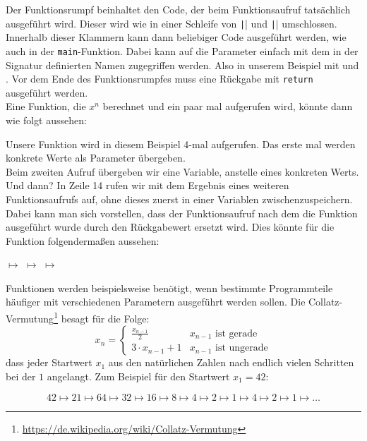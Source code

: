 Der Funktionsrumpf beinhaltet den Code, der beim Funktionsaufruf tatsächlich ausgeführt wird.
Dieser wird wie in einer Schleife von \texttt|{| und \texttt|}| umschlossen.
Innerhalb dieser Klammern kann dann beliebiger Code ausgeführt werden, wie auch in der \texttt{main}-Funktion.
Dabei kann auf die Parameter einfach mit dem in der Signatur definierten Namen zugegriffen werden.
Also in unserem Beispiel mit  und .
Vor dem Ende des Funktionsrumpfes muss eine Rückgabe mit \texttt{return} ausgeführt werden.\\
\newpage
Eine Funktion, die $ x^n $ berechnet und ein paar mal aufgerufen wird, könnte dann wie folgt aussehen:


Unsere Funktion wird in diesem Beispiel 4-mal aufgerufen.
Das erste mal werden konkrete Werte als Parameter übergeben.\\
Beim zweiten Aufruf übergeben wir eine Variable, anstelle eines konkreten Werts.\\
Und dann? In Zeile 14 rufen wir  mit dem Ergebnis eines weiteren Funktionsaufrufs auf, ohne dieses zuerst in einer Variablen zwischenzuspeichern.
Dabei kann man sich vorstellen, dass der Funktionsaufruf nach dem die Funktion ausgeführt wurde durch den Rückgabewert ersetzt wird.
Dies könnte für die Funktion  folgendermaßen aussehen:

\begin{center}
	 $\mapsto$  $\mapsto$  $\mapsto$ 
\end{center}




Funktionen werden beispielsweise benötigt, wenn bestimmte Programmteile häufiger mit verschiedenen Parametern ausgeführt werden sollen.
Die Collatz-Vermutung\footnote{\url{https://de.wikipedia.org/wiki/Collatz-Vermutung}} besagt für die Folge:
\[
	x_n =
	\begin{cases}
		\frac{x_{n-1}}{2}   & x_{n-1} \text{ ist gerade}   \\
		3 \cdot x_{n-1} + 1 & x_{n-1} \text{ ist ungerade}
	\end{cases}
\]
dass jeder Startwert $x_1$ aus den natürlichen Zahlen nach endlich vielen Schritten bei der $1$ angelangt.
Zum Beispiel für den Startwert $x_1 = 42$:

\[
	42 \mapsto 21 \mapsto 64 \mapsto 32 \mapsto 16 \mapsto 8 \mapsto 4 \mapsto 2 \mapsto 1 \mapsto 4 \mapsto 2 \mapsto 1 \mapsto \ldots
\]

